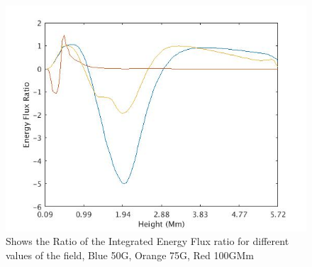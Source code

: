 \documentclass[twocolumn]{aastex62}
\begin{document}
\begin{figure}
    \label{energyfluxratio_50G_75G_100G_line}
    \centering
    \includegraphics[scale=0.425]{imrescale/energyfluxratio.jpg}
    \caption{Shows the Ratio of the Integrated Energy Flux ratio for different values of the field, Blue 50G, Orange 75G, Red 100GMm}
\end{figure}
\end{document}

